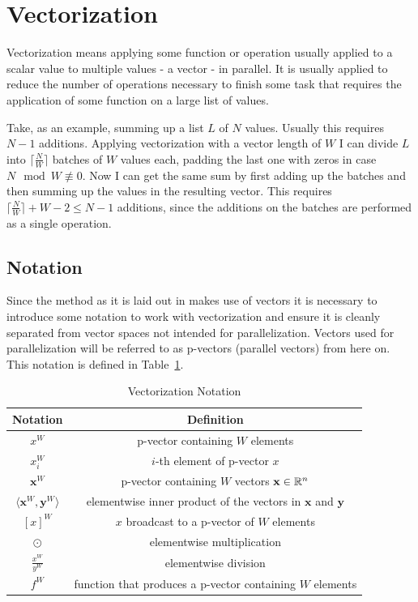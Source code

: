 \documentclass[a4paper, 11pt]{memoir}
\begin{document}
    \section{Vectorization}
    \label{sec:vectorization}
    Vectorization means applying some function or operation usually applied to a scalar value to multiple values - a
    vector - in parallel. It is usually applied to reduce the number of operations necessary to finish some task that
    requires the application of some function on a large list of values.

    Take, as an example, summing up a list $L$ of $N$ values. Usually this requires $N - 1$ additions. Applying
    vectorization with a vector length of $W$ I can divide $L$ into $\lceil \frac{N}{W} \rceil$ batches of $W$ values
    each, padding the last one with zeros in case $N \mod W \not\equiv 0$. Now I can get the same sum by first adding
    up the batches and then summing up the values in the resulting vector. This requires $\lceil \frac{N}{W} \rceil +
    W - 2 \leq N - 1$ additions, since the additions on the batches are performed as a single operation.

    \subsection{Notation}
    \label{sec:notation}
    Since the method as it is laid out in \cite{Rhodin:2015} makes use of vectors it is necessary to introduce
    some notation to work with vectorization and ensure it is cleanly separated from vector spaces not intended for parallelization.
    Vectors used for parallelization will be referred to as p-vectors (parallel vectors) from here on. This notation is
    defined in Table~\ref{tab:notation}.
    \begin{table}[b]
        \centering
        \begin{tabular}{|c|c|}
            \hline
            Notation & Definition \\
            \hline
            $x^W$ & p-vector containing $W$ elements\\
            $x^W_i$ & $i$-th element of p-vector $x$\\
            $\mathbf{x}^W$ & p-vector containing $W$ vectors $\mathbf{x} \in \mathbb{R}^n$\\
            $\langle \mathbf{x}^W, \mathbf{y}^W \rangle$ & elementwise inner product of the vectors in $\mathbf{x}$ and $\mathbf{y}$\\
            $[ x ]^W$ & $x$ broadcast to a p-vector of $W$ elements\\
            $\odot$ & elementwise multiplication\\
            $\frac{x^W}{y^W}$ & elementwise division\\
            $f^W$ & function that produces a p-vector containing $W$ elements\\\hline
        \end{tabular}
        \caption{Vectorization Notation}
        \label{tab:notation}
    \end{table}
\end{document}

